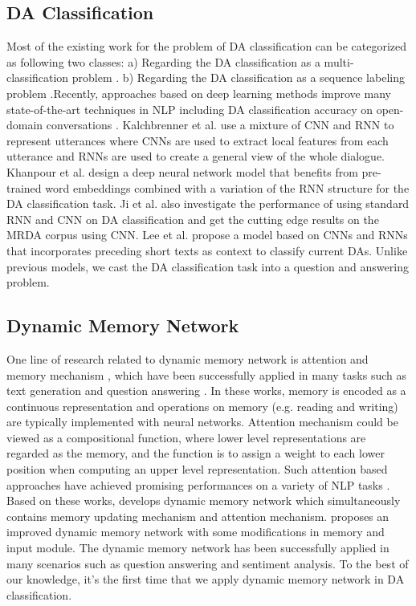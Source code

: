 \documentclass[conference]{IEEEtran}
\begin{document}
	\subsection{DA Classification}
	Most of the existing work for the problem of DA classification can be categorized as following two classes: a) Regarding the DA classification as a multi-classification problem \cite{reithinger1997dialogue,geertzen2007multidimensional}. b) Regarding the DA classification as a sequence labeling problem \cite{surendran2006dialog}.Recently, approaches based on deep learning methods improve many state-of-the-art techniques in NLP including DA classification accuracy on open-domain conversations \cite{kalchbrenner2013recurrent,khanpour2016dialogue,ji2016latent,lee2016sequential}. Kalchbrenner et al. \cite{kalchbrenner2013recurrent} use a mixture of CNN and RNN to represent utterances where CNNs are used to extract local features from each utterance and RNNs are used to create a general view of the whole dialogue. Khanpour et al. \cite{khanpour2016dialogue} design a deep neural network model that benefits from pre-trained word embeddings combined with a variation of the RNN structure for the DA classification task. Ji et al. \cite{ji2016latent} also investigate the performance of using standard RNN and CNN on DA classification and get the cutting edge results on the MRDA corpus using CNN. Lee et al. \cite{lee2016sequential} propose a model based on CNNs and RNNs that incorporates preceding short texts as context to classify current DAs. Unlike previous models, we cast the DA classification task into a question and answering problem.
	
\subsection{Dynamic Memory Network} One line of research related to dynamic memory network is attention and memory mechanism \cite{graves2014neural,bahdanau2014neural}, which have been successfully applied in many tasks such as text generation \cite{you2016image, wan2018improving} and question answering \cite{zhao2017video,pan2017memen}. In these works,  memory is encoded as a continuous representation and operations on memory (e.g. reading and writing) are typically implemented with neural networks. Attention mechanism could be viewed as a compositional function, where lower level representations are regarded as the memory, and the function is to assign a weight to each lower position when computing an upper level representation. Such attention based approaches have achieved promising performances on a variety of NLP tasks \cite{luong2015effective}. Based on these works, \cite{kumar2016ask} develops dynamic memory network which simultaneously contains memory updating mechanism and attention mechanism. \cite{xiong2016dynamic} proposes an improved dynamic memory network with some modifications in memory and input module. The dynamic memory network has been successfully applied in many scenarios such as question answering and sentiment analysis. To the best of our knowledge, it's the first time that we apply dynamic memory network in DA classification.  
\end{document}
